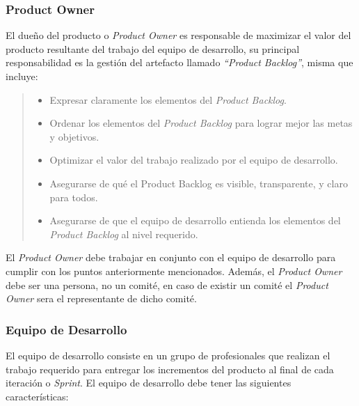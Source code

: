 \subsubsection{Product Owner}

 \noindent El dueño del producto o {\em Product Owner} es responsable de maximizar el valor
 del producto resultante del trabajo del equipo de desarrollo, su principal responsabilidad
 es la gestión del artefacto llamado {\em``Product Backlog''}, misma que incluye:

    \begin{quote}
    \begin{itemize}
        \item Expresar claramente los elementos del {\it Product Backlog}.
        \item Ordenar los elementos del {\it Product Backlog} para lograr mejor las metas y objetivos.
        \item Optimizar el valor del trabajo realizado por el equipo de desarrollo.
        \item Asegurarse de qué el Product Backlog es visible, transparente, y claro para todos.
        \item Asegurarse de que el equipo de desarrollo entienda los elementos del {\it Product Backlog}
                al nivel requerido.\\
    \end{itemize}
    \end{quote}

 \noindent El {\it Product Owner} debe trabajar en conjunto con el equipo de desarrollo para cumplir con
 los puntos anteriormente mencionados. Además, el {\it Product Owner} debe ser una persona, no un comité,
 en caso de existir un comité el {\it Product Owner} sera el representante de dicho comité.

\subsubsection{Equipo de Desarrollo}

 El equipo de desarrollo consiste en un grupo de profesionales que realizan el trabajo requerido para
 entregar los incrementos del producto al final de cada iteración o {\it Sprint}. El equipo de desarrollo
 debe tener las siguientes características:

